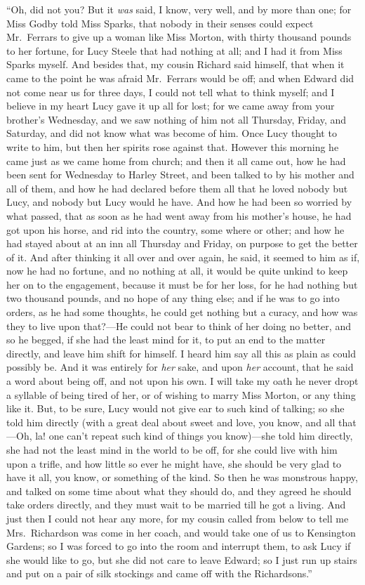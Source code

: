 ``Oh, did not you?  But it \emph{was} said, I know, very well,
and by more than one; for Miss Godby told Miss Sparks,
that nobody in their senses could expect Mr.\ Ferrars
to give up a woman like Miss Morton, with thirty thousand
pounds to her fortune, for Lucy Steele that had
nothing at all; and I had it from Miss Sparks myself.
And besides that, my cousin Richard said himself,
that when it came to the point he was afraid Mr.\ Ferrars
would be off; and when Edward did not come near us
for three days, I could not tell what to think myself;
and I believe in my heart Lucy gave it up all for lost;
for we came away from your brother's Wednesday,
and we saw nothing of him not all Thursday, Friday,
and Saturday, and did not know what was become of him.
Once Lucy thought to write to him, but then her spirits
rose against that.  However this morning he came just
as we came home from church; and then it all came out,
how he had been sent for Wednesday to Harley Street,
and been talked to by his mother and all of them,
and how he had declared before them all that he loved
nobody but Lucy, and nobody but Lucy would he have.
And how he had been so worried by what passed,
that as soon as he had went away from his mother's house,
he had got upon his horse, and rid into the country,
some where or other; and how he had stayed about at an inn
all Thursday and Friday, on purpose to get the better
of it.  And after thinking it all over and over again,
he said, it seemed to him as if, now he had no fortune,
and no nothing at all, it would be quite unkind to keep
her on to the engagement, because it must be for her loss,
for he had nothing but two thousand pounds, and no hope
of any thing else; and if he was to go into orders,
as he had some thoughts, he could get nothing but a curacy,
and how was they to live upon that?---He could not bear
to think of her doing no better, and so he begged,
if she had the least mind for it, to put an end to the
matter directly, and leave him shift for himself.
I heard him say all this as plain as could possibly be.
And it was entirely for \emph{her} sake, and upon \emph{her} account,
that he said a word about being off, and not upon his own.
I will take my oath he never dropt a syllable of being
tired of her, or of wishing to marry Miss Morton, or any
thing like it.  But, to be sure, Lucy would not give
ear to such kind of talking; so she told him directly
(with a great deal about sweet and love, you know,
and all that---Oh, la! one can't repeat such kind of things
you know)---she told him directly, she had not the least
mind in the world to be off, for she could live with him
upon a trifle, and how little so ever he might have,
she should be very glad to have it all, you know,
or something of the kind.  So then he was monstrous happy,
and talked on some time about what they should do,
and they agreed he should take orders directly,
and they must wait to be married till he got a living.
And just then I could not hear any more, for my cousin
called from below to tell me Mrs.\ Richardson was come in
her coach, and would take one of us to Kensington Gardens;
so I was forced to go into the room and interrupt them,
to ask Lucy if she would like to go, but she did not
care to leave Edward; so I just run up stairs and put
on a pair of silk stockings and came off with the Richardsons.''

